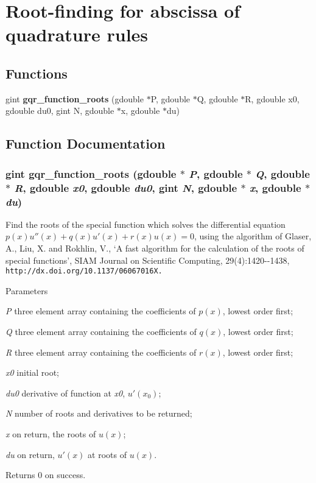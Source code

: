 \section{Root-\/finding for abscissa of quadrature rules}
\label{group__roots}
\subsection*{Functions}
\begin{DoxyCompactItemize}
\item 
gint {\bf gqr\_\-function\_\-roots} (gdouble $\ast$P, gdouble $\ast$Q, gdouble $\ast$R, gdouble x0, gdouble du0, gint N, gdouble $\ast$x, gdouble $\ast$du)
\end{DoxyCompactItemize}


\subsection{Function Documentation}
\subsubsection[{gqr\_\-function\_\-roots}]{\setlength{\rightskip}{0pt plus 5cm}gint gqr\_\-function\_\-roots (gdouble $\ast$ {\em P}, \/  gdouble $\ast$ {\em Q}, \/  gdouble $\ast$ {\em R}, \/  gdouble {\em x0}, \/  gdouble {\em du0}, \/  gint {\em N}, \/  gdouble $\ast$ {\em x}, \/  gdouble $\ast$ {\em du})}\label{group__roots_ga44f1b9e71af71ab418796a10e5cd86f3}
Find the roots of the special function which solves the differential equation $p(x)u''(x) + q(x)u'(x) + r(x)u(x) = 0$, using the algorithm of Glaser, A., Liu, X. and Rokhlin, V., `A fast algorithm for the calculation of the roots of special functions', SIAM Journal on Scientific Computing, 29(4):1420-\/-\/1438, {\tt http://dx.doi.org/10.1137/06067016X.}


\begin{DoxyParams}{Parameters}
\item[{\em P}]three element array containing the coefficients of $p(x)$, lowest order first; \item[{\em Q}]three element array containing the coefficients of $q(x)$, lowest order first; \item[{\em R}]three element array containing the coefficients of $r(x)$, lowest order first; \item[{\em x0}]initial root; \item[{\em du0}]derivative of function at {\itshape x0\/}, $u'(x_{0})$; \item[{\em N}]number of roots and derivatives to be returned; \item[{\em x}]on return, the roots of $u(x)$; \item[{\em du}]on return, $u'(x)$ at roots of $u(x)$.\end{DoxyParams}
\begin{DoxyReturn}{Returns}
0 on success. 
\end{DoxyReturn}
